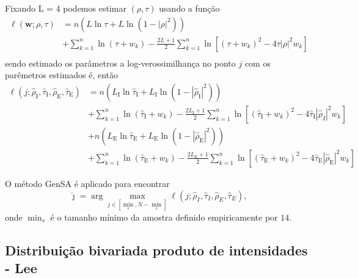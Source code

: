 Fixando L = 4 podemos estimar $(\rho, \tau)$ usando a função 
\begin{equation}\label{eq_log_vero_razao_intensidade_red_tau_w_L_fixo}
\begin{split}
    \ell(\bm w;\rho, \tau)&=n\left(L\ln\tau+L\ln(1-|\rho|^2)\right)\\
                         &+\sum_{k=1}^{n}\ln(\tau+w_k)
                         -\frac{2L+1}{2}\sum_{k=1}^{n} \ln\left[(\tau+w_k)^2-4\tau|\rho|^2w_k\right]\\
\end{split}
 \end{equation}    
sendo estimado os parâmetros a log-verossimilhança no ponto $j$ com os parêmetros estimados é, então
\begin{equation}\label{eq:TotalLogLikelihood_razao_L_fixo}
\begin{split}
\ell(j;\widehat{\rho}_\text{I}, \widehat{\tau}_\text{I}, \widehat{\rho}_\text{E},\widehat{\tau}_\text{E})&=
                         n\left(L_\text{I}\ln\widehat{\tau}_\text{I} +L_\text{I}\ln(1-|\widehat{\rho}_\text{I}|^2)\right)\\
                         &+\sum_{k=1}^{n}\ln(\widehat{\tau}_\text{I}+w_k)
                         -\frac{2L_\text{I}+1}{2}\sum_{k=1}^{n} \ln\left[(\widehat{\tau}_\text{I}+w_k)^2-4\widehat{\tau}_\text{I}|\widehat{\rho}_{I}|^2w_k\right]\\
                         &+n\left(L_\text{E}\ln\widehat{\tau}_\text{E}
                          +L_\text{E}\ln(1-|\widehat{\rho}_\text{E}|^2)\right)\\
                         &+\sum_{k=1}^{n}\ln(\widehat{\tau}_\text{E}+w_k)
                          -\frac{2L_\text{E}+1}{2}\sum_{k=1}^{n} \ln\left[(\widehat{\tau}_\text{E}+w_k)^2-4\widehat{\tau}_\text{E}|\widehat{\rho}_\text{E}|^2w_k\right]
\end{split}
\end{equation}

O método GenSA é aplicado para encontrar
$$
\widehat{\jmath}= \arg\max\limits_{j\in [\min_s,N-\min_s]}\ell(j;\widehat{\rho}_I,\widehat{\tau}_I,\widehat{\rho}_E, \widehat{\tau}_E),
$$ 
onde $\min_s$ é o tamanho mínimo da amostra definido empiricamente por $14$.
\subsection{Distribuição bivariada produto de intensidades - Lee } 

